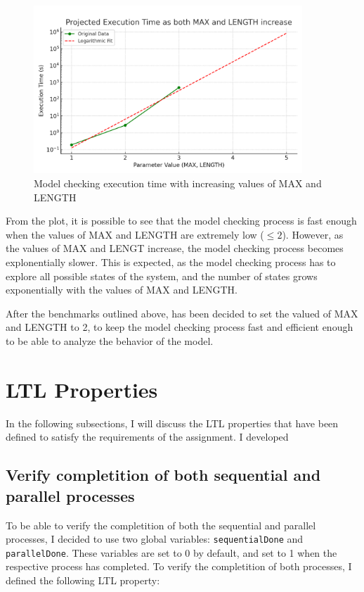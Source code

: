 \documentclass[a4paper, 11pt]{article}
\begin{document}
\begin{figure}[H]
	\centering
	\includegraphics[width=0.9\textwidth]{./images/max_len_increase_exec_time.png}
	\caption{Model checking execution time with increasing values of MAX and LENGTH}
	\label{fig:all_execution_time}
\end{figure}

From the plot, it is possible to see that the model checking process is fast enough when the values of MAX and LENGTH are extremely low ($\leq 2$). However, as the values of MAX and LENGT increase, the model checking process becomes explonentially slower. This is expected, as the model checking process has to explore all possible states of the system, and the number of states grows exponentially with the values of MAX and LENGTH.

After the benchmarks outlined above, has been decided to set the valued of MAX and LENGTH to 2, to keep the model checking process fast and efficient enough to be able to analyze the behavior of the model.

\section{LTL Properties}

In the following subsections, I will discuss the LTL properties that have been defined to satisfy the requirements of the assignment. I developed

\subsection{Verify completition of both sequential and parallel processes}

To be able to verify the completition of both the sequential and parallel processes, I decided to use two global variables: \texttt{sequentialDone} and \texttt{parallelDone}. These variables are set to 0 by default, and set to 1 when the respective process has completed. To verify the completition of both processes, I defined the following LTL property:
\end{document}
